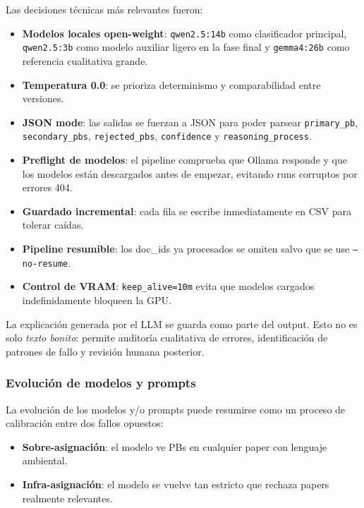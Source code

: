 Las decisiones técnicas más relevantes fueron:

\begin{itemize}
\item \textbf{Modelos locales open-weight}: \texttt{qwen2.5:14b} como clasificador principal, \texttt{qwen2.5:3b} como modelo auxiliar ligero en la fase final y \texttt{gemma4:26b} como referencia cualitativa grande.
\item \textbf{Temperatura 0.0}: se prioriza determinismo y comparabilidad entre versiones.
\item \textbf{JSON mode}: las salidas se fuerzan a JSON para poder parsear \texttt{primary\_pb}, \texttt{secondary\_pbs}, \texttt{rejected\_pbs}, \texttt{confidence} y \texttt{reasoning\_process}.
\item \textbf{Preflight de modelos}: el pipeline comprueba que Ollama responde y que los modelos están descargados antes de empezar, evitando runs corruptos por errores 404.
\item \textbf{Guardado incremental}: cada fila se escribe inmediatamente en CSV para tolerar caídas.
\item \textbf{Pipeline resumible}: los doc\_ids ya procesados se omiten salvo que se use \texttt{--no-resume}.
\item \textbf{Control de VRAM}: \texttt{keep\_alive=10m} evita que modelos cargados indefinidamente bloqueen la GPU.
\end{itemize}

La explicación generada por el LLM se guarda como parte del output. Esto no es solo \emph{texto bonito}: permite auditoría cualitativa de errores, identificación de patrones de fallo y revisión humana posterior.

\subsubsection*{Evolución de modelos y prompts}

La evolución de los modelos y/o prompts puede resumirse como un proceso de calibración entre dos fallos opuestos:

\begin{itemize}
\item \textbf{Sobre-asignación}: el modelo ve PBs en cualquier paper con lenguaje ambiental.
\item \textbf{Infra-asignación}: el modelo se vuelve tan estricto que rechaza papers realmente relevantes.
\end{itemize}

